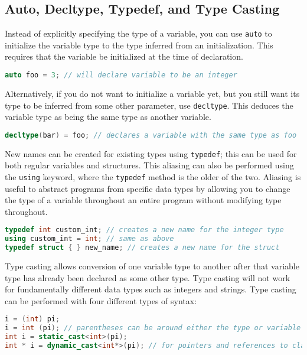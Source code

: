 \documentclass[10pt]{article}
\begin{document}
\subsection{Auto, Decltype, Typedef, and Type Casting}

Instead of explicitly specifying the type of a variable, you can use \texttt{auto} to initialize the variable type to the type inferred from an initialization. This requires that the variable be initialized at the time of declaration.

\begin{lstlisting}[language=C++]
auto foo = 3; // will declare variable to be an integer
\end{lstlisting}

Alternatively, if you do not want to initialize a variable yet, but you still want its type to be inferred from some other parameter, use \texttt{decltype}. This deduces the variable type as being the same type as another variable.

\begin{lstlisting}[language=C++]
decltype(bar) = foo; // declares a variable with the same type as foo
\end{lstlisting}

New names can be created for existing types using \texttt{typedef}; this can be used for both regular variables and structures. This aliasing can also be performed using the \texttt{using} keyword, where the \texttt{typedef} method is the older of the two. Aliasing is useful to abstract programs from specific data types by allowing you to change the type of a variable throughout an entire program without modifying type throughout.

\begin{lstlisting}[language=C++]
typedef int custom_int; // creates a new name for the integer type
using custom_int = int; // same as above
typedef struct { } new_name; // creates a new name for the struct
\end{lstlisting}

Type casting allows conversion of one variable type to another after that variable type has already been declared as some other type. Type casting will not work for fundamentally different data types such as integers and strings. Type casting can be performed with four different types of syntax:

\begin{lstlisting}[language=C++]
i = (int) pi; 
i = int (pi); // parentheses can be around either the type or variable
int i = static_cast<int>(pi);
int * i = dynamic_cast<int*>(pi); // for pointers and references to classes
\end{lstlisting}
\end{document}
